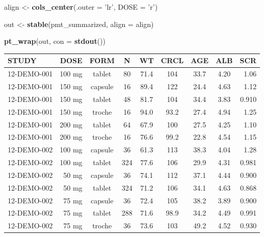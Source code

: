 \documentclass[
]{article}
\newenvironment{Shaded}{\begin{snugshade}}{\end{snugshade}}
\newcommand{\DataTypeTok}[1]{\textcolor[rgb]{0.13,0.29,0.53}{#1}}
\newcommand{\KeywordTok}[1]{\textcolor[rgb]{0.13,0.29,0.53}{\textbf{#1}}}
\newcommand{\NormalTok}[1]{#1}
\newcommand{\StringTok}[1]{\textcolor[rgb]{0.31,0.60,0.02}{#1}}
\begin{document}
\begin{Shaded}
\begin{Highlighting}[]
\NormalTok{align <-}\StringTok{ }\KeywordTok{cols_center}\NormalTok{(}\DataTypeTok{.outer =} \StringTok{'lr'}\NormalTok{, }\DataTypeTok{DOSE =} \StringTok{'r'}\NormalTok{)}

\NormalTok{out <-}\StringTok{ }\KeywordTok{stable}\NormalTok{(pmt_summarized, }\DataTypeTok{align =}\NormalTok{ align)}

\KeywordTok{pt_wrap}\NormalTok{(out, }\DataTypeTok{con =} \KeywordTok{stdout}\NormalTok{()) }
\end{Highlighting}
\end{Shaded}

\begin{table}[h]
\centering
{\def\arraystretch{1.4}\tabcolsep=5pt
\begin{threeparttable}
\begin{tabular}[h]{lrccccccr}
\hline
STUDY & DOSE & FORM & N & WT & CRCL & AGE & ALB & SCR \\
\hline
12-DEMO-001 & 100 mg & tablet & 80 & 71.4 & 104 & 33.7 & 4.20 & 1.06 \\
12-DEMO-001 & 150 mg & capsule & 16 & 89.4 & 122 & 24.4 & 4.63 & 1.12 \\
12-DEMO-001 & 150 mg & tablet & 48 & 81.7 & 104 & 34.4 & 3.83 & 0.910 \\
12-DEMO-001 & 150 mg & troche & 16 & 94.0 & 93.2 & 27.4 & 4.94 & 1.25 \\
12-DEMO-001 & 200 mg & tablet & 64 & 67.9 & 100 & 27.5 & 4.25 & 1.10 \\
12-DEMO-001 & 200 mg & troche & 16 & 76.6 & 99.2 & 22.8 & 4.54 & 1.15 \\
12-DEMO-002 & 100 mg & capsule & 36 & 61.3 & 113 & 38.3 & 4.04 & 1.28 \\
12-DEMO-002 & 100 mg & tablet & 324 & 77.6 & 106 & 29.9 & 4.31 & 0.981 \\
12-DEMO-002 & 50 mg & capsule & 36 & 74.1 & 112 & 37.1 & 4.44 & 0.900 \\
12-DEMO-002 & 50 mg & tablet & 324 & 71.2 & 106 & 34.1 & 4.63 & 0.868 \\
12-DEMO-002 & 75 mg & capsule & 36 & 72.4 & 105 & 38.2 & 3.89 & 0.900 \\
12-DEMO-002 & 75 mg & tablet & 288 & 71.6 & 98.9 & 34.2 & 4.49 & 0.991 \\
12-DEMO-002 & 75 mg & troche & 36 & 73.6 & 103 & 49.2 & 4.52 & 0.930 \\
\hline
\end{tabular}
\end{threeparttable}
}
\end{table}
\end{document}
